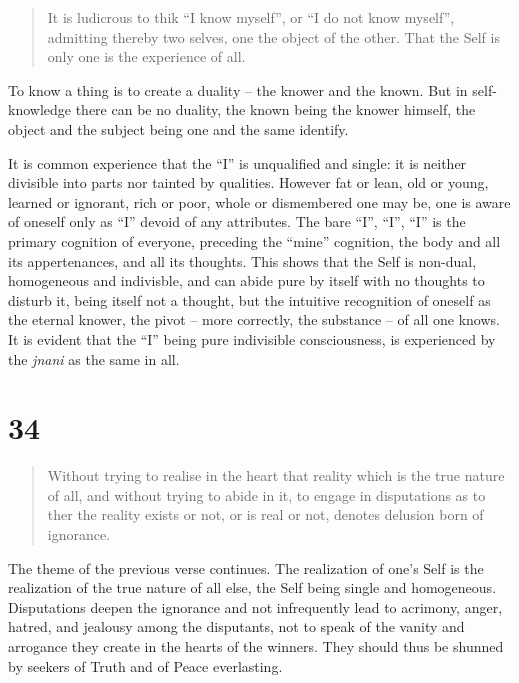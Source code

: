 \documentclass[12pt]{report}
\begin{document}
\begin{quote}
  It is ludicrous to thik ``I know myself'', or ``I do not know
  myself'', admitting thereby two selves, one the object of the
  other. That the Self is only one is the experience of all.
\end{quote}


To know a thing is to create a duality -- the knower and the
known. But in self-knowledge there can be no duality, the known being
the knower himself, the object and the subject being one and the same
identify.

It is common experience that the ``I'' is unqualified and single: it
is neither divisible into parts nor tainted by qualities. However fat
or lean, old or young, learned or ignorant, rich or poor, whole or
dismembered one may be, one is aware of oneself only as ``I'' devoid
of any attributes. The bare ``I'', ``I'', ``I'' is the primary
cognition of everyone, preceding the ``mine'' cognition, the body and
all its appertenances, and all its thoughts. This shows that the Self
is non-dual, homogeneous and indivisble, and can abide pure by itself
with no thoughts to disturb it, being itself not a thought, but the
intuitive recognition of oneself as the eternal knower, the pivot --
more correctly, the substance -- of all one knows. It is evident that
the ``I'' being pure indivisible consciousness, is experienced by the
\emph{jnani} as the same in all.

\section{34}

\begin{quote}
  Without trying to realise in the heart that reality which is the
  true nature of all, and without trying to abide in it, to engage in
  disputations as to ther the reality exists or not, or is real or
  not, denotes delusion born of ignorance.
\end{quote}


The theme of the previous verse continues. The realization of one's
Self is the realization of the true nature of all else, the Self being
single and homogeneous. Disputations deepen the ignorance and not
infrequently lead to acrimony, anger, hatred, and jealousy among the
disputants, not to speak of the vanity and arrogance they create in
the hearts of the winners. They should thus be shunned by seekers of
Truth and of Peace everlasting.
\end{document}

